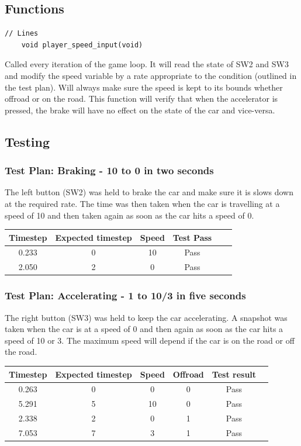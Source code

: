 \documentclass{article}
\begin{document}
\subsection*{Functions}
\begin{lstlisting}[style=CStyle]
	// Lines
	void player_speed_input(void)
\end{lstlisting}
Called every iteration of the game loop. It will read the state of SW2 and SW3 and modify the speed variable by a rate appropriate to the condition (outlined in the test plan). Will always make sure the speed is kept to its bounds whether offroad or on the road. This function will verify that when the accelerator is pressed, the brake will have no effect on the state of the car and vice-versa. 
\newline

\subsection*{Testing}
\subsubsection{Test Plan: Braking - 10 to 0 in two seconds}
The left button (SW2) was held to brake the car and make sure it is slows down at the required rate. The time was then taken when the car is travelling at a speed of 10 and then taken again as soon as the car hits a speed of 0.
\begin{center}
\begin{tabular}{ c c c c c c }
Timestep	& Expected timestep	& Speed	& Test Pass	\\ \hline
0.233		& 0				& 10		& Pass	\\
2.050		& 2				& 0		& Pass 	\\ \hline
\end{tabular}
\end{center}

\subsubsection{Test Plan: Accelerating - 1 to 10/3 in five seconds}
The right button (SW3) was held to keep the car accelerating. A snapshot was taken when the car is at a speed of 0 and then again as soon as the car hits a speed of 10 or 3. The maximum speed will depend if the car is on the road or off the road.
\begin{center}
\begin{tabular}{ c c c c c c }
Timestep	& Expected timestep	& Speed	& Offroad	& Test result	\\ \hline
0.263		& 0 				& 0		& 0		& Pass	\\
5.291		& 5				& 10		& 0		& Pass	\\
2.338		& 2				& 0		& 1		& Pass	\\
7.053		& 7				& 3		& 1		& Pass	\\ \hline
\end{tabular}
\end{center}
\end{document}
